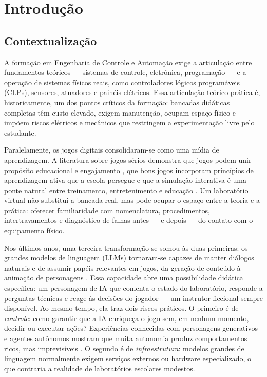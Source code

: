 \chapter{Introdução}
\label{cap:introducao}

\section{Contextualização}
\label{sec:contextualizacao}

A formação em Engenharia de Controle e Automação exige a articulação entre
fundamentos teóricos --- sistemas de controle, eletrônica, programação --- e a
operação de sistemas físicos reais, como controladores lógicos programáveis
(CLPs), sensores, atuadores e painéis elétricos. Essa articulação
teórico-prática é, historicamente, um dos pontos críticos da formação: bancadas
didáticas completas têm custo elevado, exigem manutenção, ocupam espaço físico
e impõem riscos elétricos e mecânicos que restringem a experimentação livre
pelo estudante.

Paralelamente, os jogos digitais consolidaram-se como uma mídia de
aprendizagem. A literatura sobre jogos sérios demonstra que jogos podem unir
propósito educacional e engajamento \cite{abt1970serious}, que bons jogos
incorporam princípios de aprendizagem ativa que a escola persegue
\cite{gee2003what} e que a simulação interativa é uma ponte natural entre
treinamento, entretenimento e educação \cite{zyda2005from,
laamarti2014overview}. Um laboratório virtual não substitui a bancada real,
mas pode ocupar o espaço entre a teoria e a prática: oferecer familiaridade
com nomenclatura, procedimentos, intertravamentos e diagnóstico de falhas
antes --- e depois --- do contato com o equipamento físico.

Nos últimos anos, uma terceira transformação se somou às duas primeiras: os
grandes modelos de linguagem (LLMs) tornaram-se capazes de manter diálogos
naturais e de assumir papéis relevantes em jogos, da geração de conteúdo à
animação de personagens \cite{gallotta2024largelanguage}. Essa capacidade abre
uma possibilidade didática específica: um personagem de IA que comenta o
estado do laboratório, responde a perguntas técnicas e reage às decisões do
jogador --- um instrutor ficcional sempre disponível. Ao mesmo tempo, ela
traz dois riscos práticos. O primeiro é de \emph{controle}: como garantir que
a IA enriqueça o jogo sem, em nenhum momento, decidir ou executar ações?
Experiências conhecidas com personagens generativos e agentes autônomos
mostram que muita autonomia produz comportamentos ricos, mas imprevisíveis
\cite{park2023generative,wang2023voyager}. O segundo é de
\emph{infraestrutura}: modelos grandes de linguagem normalmente exigem
serviços externos ou hardware especializado, o que contraria a realidade de
laboratórios escolares modestos.

